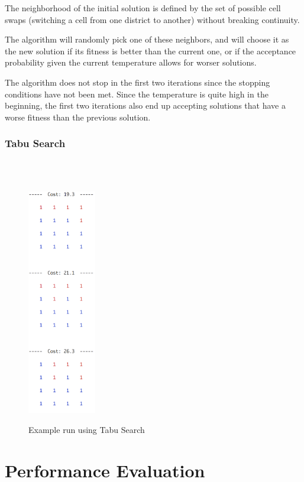 \documentclass[journal]{IEEEtran}
\begin{document}
The neighborhood of the initial solution is defined by the set of possible cell swaps (switching a cell from one district to another) without breaking continuity.

The algorithm will randomly pick one of these neighbors, and will choose it as the new solution if its fitness is better than the current one, or if the acceptance probability given the current temperature allows for worser solutions.

The algorithm does not stop in the first two iterations since the stopping conditions have not been met. Since the temperature is quite high in the beginning, the first two iterations also end up accepting solutions that have a worse fitness than the previous solution. \\

\subsubsection{Tabu Search}~\\\\
\begin{figure}[h!]
    \includegraphics[width=3cm]{sa.png}
    \centering
    \label{fig:sa_example}
    \caption{Example run using Tabu Search}
\end{figure}


\section{Performance Evaluation}
\end{document}
